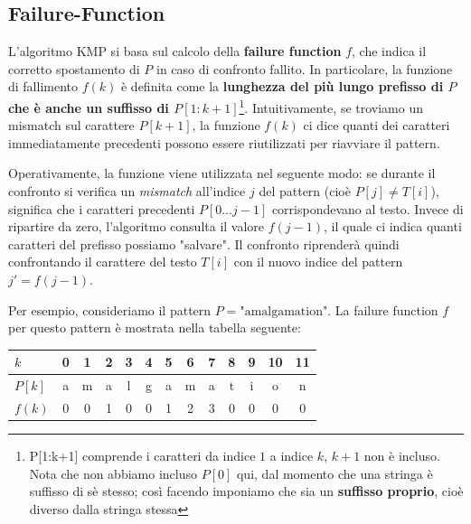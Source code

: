 \subsection{Failure-Function}
L'algoritmo KMP si basa sul calcolo della \textbf{failure function} $f$, che indica il corretto spostamento di $P$ in caso di confronto fallito. In particolare, la funzione di fallimento $f(k)$ è definita come la \textbf{lunghezza del più lungo prefisso di $P$ che è anche un suffisso di $P[1:k+1]$}\footnote{P[1:k+1] comprende i caratteri da indice $1$ a indice $k$, $k+1$ non è incluso. Nota che non abbiamo incluso $P[0]$ qui, dal momento che una stringa è suffisso di sè stesso; così facendo imponiamo che sia un \textbf{suffisso proprio}, cioè diverso dalla stringa stessa}. Intuitivamente, se troviamo un mismatch sul carattere $P[k+1]$, la funzione $f(k)$ ci dice quanti dei caratteri immediatamente precedenti possono essere riutilizzati per riavviare il pattern. 

Operativamente, la funzione viene utilizzata nel seguente modo: se durante il confronto si verifica un \textit{mismatch} all'indice $j$ del pattern (cioè $P[j] \neq T[i]$), significa che i caratteri precedenti $P[0 \dots j-1]$ corrispondevano al testo. Invece di ripartire da zero, l'algoritmo consulta il valore $f(j-1)$, il quale ci indica quanti caratteri del prefisso possiamo "salvare". Il confronto riprenderà quindi confrontando il carattere del testo $T[i]$ con il nuovo indice del pattern $j' = f(j-1)$.

\clearpage
\noindent
Per esempio, consideriamo il pattern $P = \text{"amalgamation"}$. La failure function $f$ per questo pattern è mostrata nella tabella seguente:

\begin{table}[h]
    \centering
    \begin{tabular}{l|*{12}{c}}
        \textbf{$k$} & 0 & 1 & 2 & 3 & 4 & 5 & 6 & 7 & 8 & 9 & 10 & 11 \\
        \hline
        \textbf{$P[k]$} & a & m & a & l & g & a & m & a & t & i & o & n \\
        \hline
        \textbf{$f(k)$} & 0 & 0 & 1 & 0 & 0 & 1 & 2 & 3 & 0 & 0 & 0 & 0 \\
    \end{tabular}
\end{table}


